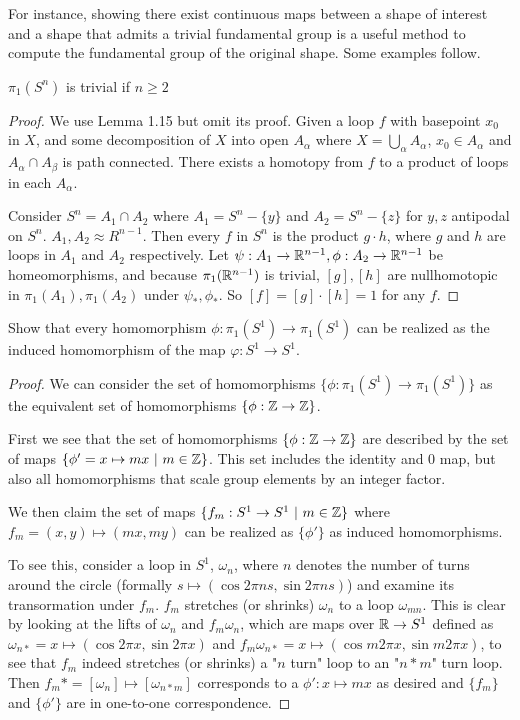 \documentclass[10pt]{article}
\begin{document}
For instance, showing there exist continuous maps between a shape of interest
and a shape that admits a trivial fundamental group is a useful method to
compute the fundamental group of the original shape. Some examples follow.

\begin{theorem}
	$\pi_1(S^n)$ is trivial if $n \geq 2$
\end{theorem}

\begin{proof}
	We use Lemma 1.15 but omit its proof. Given a loop $f$ with basepoint $x_0$ in $X$, and some
	decomposition of $X$ into open $A_{\alpha}$ where $X = \bigcup_{\alpha}
	A_{\alpha}$, $x_0 \in A_{\alpha}$ and $A_{\alpha} \cap A_{\beta}$ is path
	connected. There exists a homotopy from $f$ to a product of loops in each
	$A_{\alpha}$.

	Consider $S^n = A_1 \cap A_2$ where $A_1 = S^n - \{y\}$ and $A_2 = S^n -
	\{z\}$ for $y, z$ antipodal on $S^n$. $A_1, A_2 \approx R^{n-1}$. Then every
	$f$ in $S^n$ is the product $g \cdot h$, where $g$ and $h$ are loops in $A_1$
	and $A_2$ respectively. Let $\psi: A_1 \to \mathbb{R}^{n-1}, \phi: A_2 \to \mathbb{R}^{n-1}$
	be homeomorphisms, and because $\pi_1(\mathbb{R}^{n-1})$ is trivial, $[g], [h]$ are
	nullhomotopic in $\pi_1(A_1), \pi_1(A_2)$ under $\psi_*, \phi_*$. So $[f] =
	[g] \cdot [h] = 1$ for any $f$.
\end{proof}

\begin{exercise}[1.1.12]
	Show that every homomorphism $\phi: \pi_1(S^1) \to \pi_1(S^1)$ can be realized as the
	induced homomorphism of the map $\varphi: S^1 \to S^1$.
\end{exercise}

\begin{proof}
	We can consider the set of homomorphisms $\{\phi: \pi_1(S^1) \to \pi_1(S^1)\}$
	as the equivalent set of homomorphisms $\{\phi: \mathbb{Z} \to \mathbb{Z}\}$.

	First we see that the set of homomorphisms $\{\phi: \mathbb{Z} \to \mathbb{Z}\}$ are described by
	the set of maps $\{ \phi' = x \mapsto mx ~|~ m \in \mathbb{Z} \}$. This set includes the identity and 0
	map, but also all homomorphisms that scale group elements by an integer factor.

	We then claim the set of maps $\{f_m: S^1 \to S^1 ~|~ m \in \mathbb{Z}\}$ where $f_m = (x, y) \mapsto (mx, my)$
	can be realized as $\{ \phi' \}$ as induced homomorphisms.

	To see this, consider a loop in $S^1$, $\omega_n$, where $n$ denotes the
	number of turns around the circle (formally $s \mapsto (\cos 2\pi ns, \sin
	2\pi ns)$) and examine its transormation under $f_m$. $f_m$ stretches (or
	shrinks) $\omega_n$ to a loop $\omega_{mn}$. This is clear by looking
	at the lifts of $\omega_n$ and $f_m\omega_n$, which are maps over $\mathbb{R} \to S^1$
	defined as $\omega_{n*} = x \mapsto (\cos
	2\pi x, \sin 2\pi x)$ and $f_m\omega_{n*} = x \mapsto (\cos m 2\pi x, \sin m
	2\pi x)$, to see that $f_m$ indeed stretches (or shrinks) a "$n$ turn" loop to
	an "$n*m$" turn loop. Then $f_m* = [\omega_n] \mapsto [\omega_{n*m}]$
	corresponds to a $\phi': x \mapsto mx$ as desired and $\{f_m\}$ and
	$\{\phi'\}$ are in one-to-one correspondence.
\end{proof}
\end{document}
